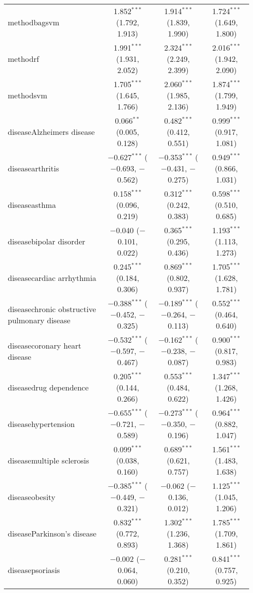 \begin{table}[!htbp]
\begin{tabular}{@{\extracolsep{5pt}}lccc}
  methodbagsvm & 1.852$^{***}$ (1.792, 1.913) & 1.914$^{***}$ (1.839, 1.990) & 1.724$^{***}$ (1.649, 1.800) \\ 
  methodrf & 1.991$^{***}$ (1.931, 2.052) & 2.324$^{***}$ (2.249, 2.399) & 2.016$^{***}$ (1.942, 2.090) \\ 
  methodsvm & 1.705$^{***}$ (1.645, 1.766) & 2.060$^{***}$ (1.985, 2.136) & 1.874$^{***}$ (1.799, 1.949) \\ 
  diseaseAlzheimers disease & 0.066$^{**}$ (0.005, 0.128) & 0.482$^{***}$ (0.412, 0.551) & 0.999$^{***}$ (0.917, 1.081) \\ 
  diseasearthritis & $-$0.627$^{***}$ ($-$0.693, $-$0.562) & $-$0.353$^{***}$ ($-$0.431, $-$0.275) & 0.949$^{***}$ (0.866, 1.031) \\ 
  diseaseasthma & 0.158$^{***}$ (0.096, 0.219) & 0.312$^{***}$ (0.242, 0.383) & 0.598$^{***}$ (0.510, 0.685) \\ 
  diseasebipolar disorder & $-$0.040 ($-$0.101, 0.022) & 0.365$^{***}$ (0.295, 0.436) & 1.193$^{***}$ (1.113, 1.273) \\ 
  diseasecardiac arrhythmia & 0.245$^{***}$ (0.184, 0.306) & 0.869$^{***}$ (0.802, 0.937) & 1.705$^{***}$ (1.628, 1.781) \\ 
  diseasechronic obstructive pulmonary disease & $-$0.388$^{***}$ ($-$0.452, $-$0.325) & $-$0.189$^{***}$ ($-$0.264, $-$0.113) & 0.552$^{***}$ (0.464, 0.640) \\ 
  diseasecoronary heart disease & $-$0.532$^{***}$ ($-$0.597, $-$0.467) & $-$0.162$^{***}$ ($-$0.238, $-$0.087) & 0.900$^{***}$ (0.817, 0.983) \\ 
  diseasedrug dependence & 0.205$^{***}$ (0.144, 0.266) & 0.553$^{***}$ (0.484, 0.622) & 1.347$^{***}$ (1.268, 1.426) \\ 
  diseasehypertension & $-$0.655$^{***}$ ($-$0.721, $-$0.589) & $-$0.273$^{***}$ ($-$0.350, $-$0.196) & 0.964$^{***}$ (0.882, 1.047) \\ 
  diseasemultiple sclerosis & 0.099$^{***}$ (0.038, 0.160) & 0.689$^{***}$ (0.621, 0.757) & 1.561$^{***}$ (1.483, 1.638) \\ 
  diseaseobesity & $-$0.385$^{***}$ ($-$0.449, $-$0.321) & $-$0.062 ($-$0.136, 0.012) & 1.125$^{***}$ (1.045, 1.206) \\ 
  diseaseParkinson's disease & 0.832$^{***}$ (0.772, 0.893) & 1.302$^{***}$ (1.236, 1.368) & 1.785$^{***}$ (1.709, 1.861) \\ 
  diseasepsoriasis & $-$0.002 ($-$0.064, 0.060) & 0.281$^{***}$ (0.210, 0.352) & 0.841$^{***}$ (0.757, 0.925) \\ 

\end{tabular}
\end{table}
